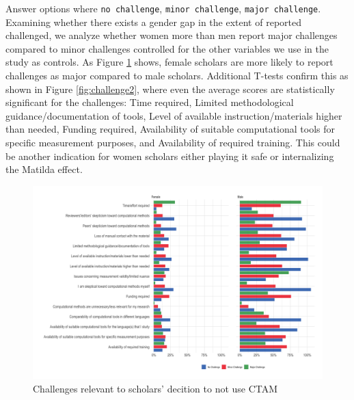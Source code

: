 \documentclass[
]{ccr}
\begin{document}
Answer options where \texttt{no\ challenge}, \texttt{minor\ challenge},
\texttt{major\ challenge}. Examining whether there exists a gender gap
in the extent of reported challenged, we analyze whether women more than
men report major challenges compared to minor challenges controlled for
the other variables we use in the study as controls. As Figure
\ref{fig:challenge1} shows, female scholars are more likely to report
challenges as major compared to male scholars. Additional T-tests
confirm this as shown in Figure \ref{fig:challenge2}, where even the
average scores are statistically significant for the challenges: Time
required, Limited methodological guidance/documentation of tools, Level
of available instruction/materials higher than needed, Funding required,
Availability of suitable computational tools for specific measurement
purposes, and Availability of required training. This could be another
indication for women scholars either playing it safe or internalizing
the Matilda effect.

\begin{figure}[t]

{\centering \includegraphics[width=1\textwidth,height=\textheight]{figures/challenges-distribution-1.png}

}

\caption{\label{fig:challenge1}Challenges relevant to scholars' decition
to not use CTAM}

\end{figure}
\end{document}
